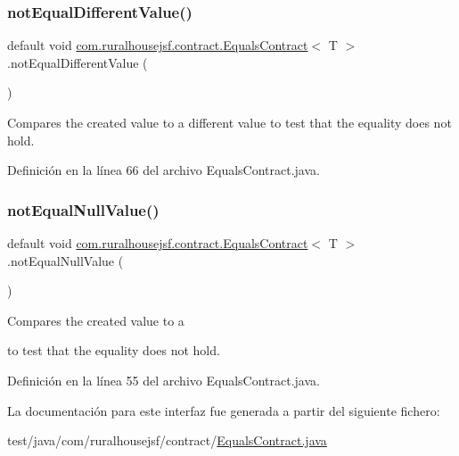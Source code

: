 \subsubsection{\texorpdfstring{notEqualDifferentValue()}{notEqualDifferentValue()}}
{\footnotesize\ttfamily default void \mbox{\hyperlink{interfacecom_1_1ruralhousejsf_1_1contract_1_1_equals_contract}{com.\+ruralhousejsf.\+contract.\+Equals\+Contract}}$<$ T $>$.not\+Equal\+Different\+Value (\begin{DoxyParamCaption}{ }\end{DoxyParamCaption})}

Compares the created value to a different value to test that the equality does not hold. 

Definición en la línea 66 del archivo Equals\+Contract.\+java.

\mbox{\label{interfacecom_1_1ruralhousejsf_1_1contract_1_1_equals_contract_adda6a50dc1babeb3783fd92a09aac788}} 
\subsubsection{\texorpdfstring{notEqualNullValue()}{notEqualNullValue()}}
{\footnotesize\ttfamily default void \mbox{\hyperlink{interfacecom_1_1ruralhousejsf_1_1contract_1_1_equals_contract}{com.\+ruralhousejsf.\+contract.\+Equals\+Contract}}$<$ T $>$.not\+Equal\+Null\+Value (\begin{DoxyParamCaption}{ }\end{DoxyParamCaption})}

Compares the created value to a
\begin{DoxyCode}{0}
\DoxyCodeLine{\textcolor{keyword}{null} }
\end{DoxyCode}
 to test that the equality does not hold. 

Definición en la línea 55 del archivo Equals\+Contract.\+java.



La documentación para este interfaz fue generada a partir del siguiente fichero\+:\begin{DoxyCompactItemize}
\item 
test/java/com/ruralhousejsf/contract/\mbox{\hyperlink{_equals_contract_8java}{Equals\+Contract.\+java}}\end{DoxyCompactItemize}
